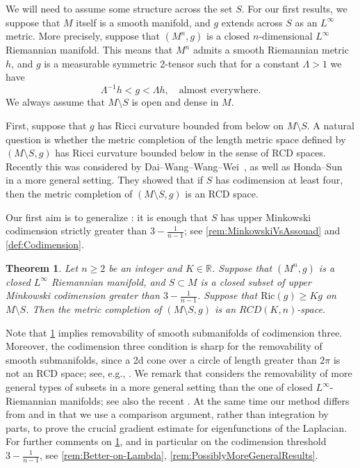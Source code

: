 \documentclass[12pt,a4paper,reqno]{amsart}
\newtheorem{theorem}{Theorem}[section]
\renewcommand{\geq}{\geqslant}
\begin{document}
We will need to assume some structure across the set $S$. For our first results, we suppose that $M$ itself is a smooth manifold, and $g$ extends across $S$ as an $L^\infty$ metric. More precisely, suppose that $(M^n, g)$ is a closed $n$-dimensional $L^\infty$ Riemannian manifold. This means that $M^n$ admits a smooth Riemannian metric $h$, and $g$ is a measurable symmetric 2-tensor such that for a constant $\Lambda > 1$ we have 
\begin{equation}\label{eqn:LambdaDef}
\Lambda^{-1} h < g < \Lambda h, \quad
\text{almost everywhere}.
\end{equation}
We always assume that $M\setminus S$ is open and dense in $M$. 
\smallskip

First, suppose that $g$ has Ricci curvature bounded from below on $M\setminus S$. A natural question is whether the metric completion of the length metric space defined by $(M\setminus S, g)$ has Ricci curvature bounded below in the sense of RCD spaces. Recently this was considered by Dai--Wang--Wang--Wei~\cite[Theorem 1.5]{DWWW}, as well as Honda--Sun~\cite[Theorem 1.2]{HondaSun} in a more general setting. They showed that if $S$ has codimension at least four, then the metric completion of $(M\setminus S,g)$ is an RCD space.

Our first aim is to generalize \cite[Theorem 1.5]{DWWW}: it is enough that $S$ has upper Minkowski codimension strictly greater than $3-\frac{1}{n-1}$; see \cref{rem:MinkowskiVsAssouad} and \cref{def:Codimension}.
\begin{theorem}\label{thm:RCDcodim3}
 Let $n\geq 2$ be an integer and $K\in\mathbb R$. Suppose that $(M^n, g)$ is a closed $L^\infty$ Riemannian manifold, and $S\subset M$ is a closed subset of upper Minkowski codimension greater than $3-\frac{1}{n-1}$. Suppose that $\mathrm{Ric}(g) \geq Kg$ on $M\setminus S$. Then the metric completion of $(M\setminus S, g)$ is an $RCD(K,n)$-space. 
\end{theorem}

Note that \cref{thm:RCDcodim3} implies removability of smooth submanifolds of codimension three. Moreover, the codimension three condition is sharp for the removability of smooth submanifolds, since a 2d cone over a circle of length greater than $2\pi$ is not an RCD space; 
see, e.g., \cite[Remark 4.14]{HondaSun}. We remark that \cite{HondaSun} considers the removability of more general types of subsets in a more general setting than the one of closed $L^\infty$-Riemannian manifolds; see also the recent \cite[Section 6]{BZ26}. At the same time our method differs from \cite{DWWW} and \cite{HondaSun} in that we use a comparison argument, rather than integration by parts, to prove the crucial gradient estimate for eigenfunctions of the Laplacian. For further comments on \cref{thm:RCDcodim3}, and in particular on the codimension threshold $3-\frac{1}{n-1}$, see \cref{rem:Better-on-Lambda}, \cref{rem:PossiblyMoreGeneralResults}. 
\end{document}
